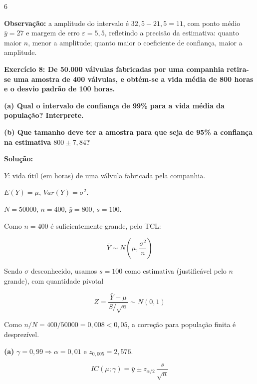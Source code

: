 \documentclass[8pt, a4paper, landscape]{extarticle}
\begin{document}
\begin{multicols}{6}
\vspace{0.2cm}

\textbf{Observação:} a amplitude do intervalo é $32,5 - 21,5 = 11$, com ponto médio $\bar{y} = 27$ e margem de erro $\varepsilon = 5,5$, refletindo a precisão da estimativa: quanto maior $n$, menor a amplitude; quanto maior o coeficiente de confiança, maior a amplitude.

\textbf{Exercício 8: De 50.000 válvulas fabricadas por uma companhia retira-se uma amostra de 400 válvulas, e obtém-se a vida média de 800 horas e o desvio padrão de 100 horas.}

\textbf{(a) Qual o intervalo de confiança de 99\% para a vida média da população? Interprete.}

\textbf{(b) Que tamanho deve ter a amostra para que seja de 95\% a confiança na estimativa $800 \pm 7,84$?}

\vspace{0.3cm}

\textbf{Solução:}

$Y$: vida útil (em horas) de uma válvula fabricada pela companhia.

$E(Y) = \mu$, \quad $Var(Y) = \sigma^2$.

$N = 50000$, \quad $n = 400$, \quad $\bar{y} = 800$, \quad $s = 100$.

Como $n = 400$ é suficientemente grande, pelo TCL:

\begin{equation*}
\bar{Y} \sim N\left(\mu, \frac{\sigma^2}{n}\right)
\end{equation*}

Sendo $\sigma$ desconhecido, usamos $s = 100$ como estimativa (justificável pelo $n$ grande), com quantidade pivotal

\begin{equation*}
Z = \frac{\bar{Y} - \mu}{S/\sqrt{n}} \sim N(0,1)
\end{equation*}

Como $n/N = 400/50000 = 0,008 < 0,05$, a correção para população finita é desprezível.

\vspace{0.2cm}

\textbf{(a)} $\gamma = 0,99 \Rightarrow \alpha = 0,01$ e $z_{0,005} = 2,576$.

\begin{equation*}
IC(\mu;\gamma) = \bar{y} \pm z_{\alpha/2}\,\frac{s}{\sqrt{n}}
\end{equation*}


\end{multicols}
\end{document}
